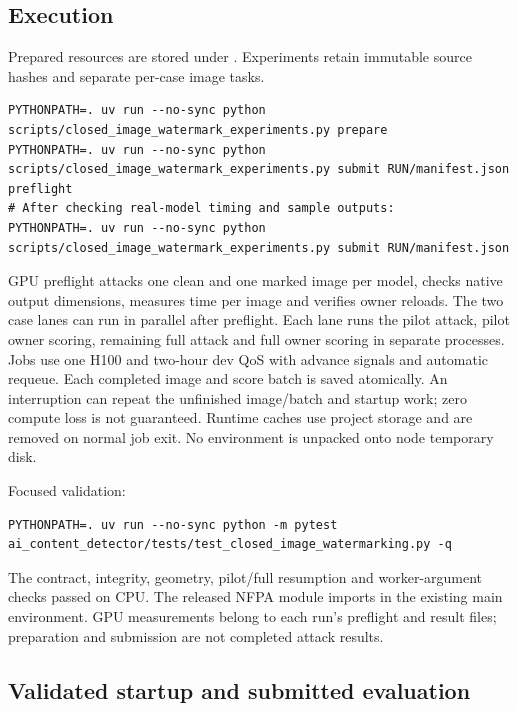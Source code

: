 \subsection{Execution}\label{record-docs-closed-image-watermarking-md-execution}

Prepared resources are stored under
\texttt{}.
Experiments retain immutable source hashes and separate per-case image
tasks.

\begin{Verbatim}
PYTHONPATH=. uv run --no-sync python scripts/closed_image_watermark_experiments.py prepare
PYTHONPATH=. uv run --no-sync python scripts/closed_image_watermark_experiments.py submit RUN/manifest.json preflight
# After checking real-model timing and sample outputs:
PYTHONPATH=. uv run --no-sync python scripts/closed_image_watermark_experiments.py submit RUN/manifest.json
\end{Verbatim}

GPU preflight attacks one clean and one marked image per model, checks
native output dimensions, measures time per image and verifies owner
reloads. The two case lanes can run in parallel after preflight. Each
lane runs the pilot attack, pilot owner scoring, remaining full attack
and full owner scoring in separate processes. Jobs use one H100 and
two-hour dev QoS with advance signals and automatic requeue. Each
completed image and score batch is saved atomically. An interruption can
repeat the unfinished image/batch and startup work; zero compute loss is
not guaranteed. Runtime caches use project storage and are removed on
normal job exit. No environment is unpacked onto node temporary disk.

Focused validation:

\begin{Verbatim}
PYTHONPATH=. uv run --no-sync python -m pytest ai_content_detector/tests/test_closed_image_watermarking.py -q
\end{Verbatim}

The contract, integrity, geometry, pilot/full resumption and
worker-argument checks passed on CPU. The released NFPA module imports
in the existing main environment. GPU measurements belong to each run's
preflight and result files; preparation and submission are not completed
attack results.

\subsection{Validated startup and submitted
evaluation}\label{record-docs-closed-image-watermarking-md-validated-startup-and-submitted-evaluation}

